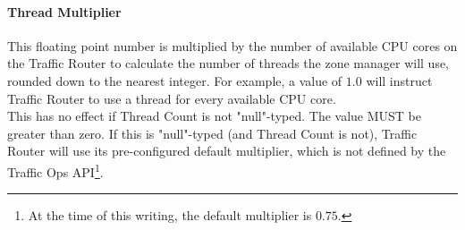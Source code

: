 \paragraph{Thread Multiplier}
This floating point number is multiplied by the number of available CPU cores on
the Traffic Router to calculate the number of threads the zone manager will use,
rounded down to the nearest integer. For example, a value of $1.0$ will instruct
Traffic Router to use a thread for every available CPU core.\\
This has no effect if Thread Count is not "null"-typed. The value MUST be
greater than zero. If this is "null"-typed (and Thread Count is not), Traffic
Router will use its pre-configured default multiplier, which is not defined by
the Traffic Ops API\footnote{At the time of this writing, the default multiplier
is $0.75$.}.
